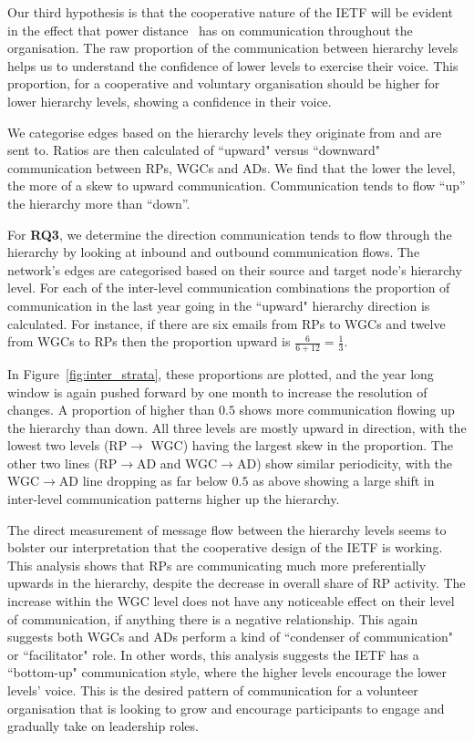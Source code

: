 \documentclass[twocolumn,10pt]{article}
\begin{document}
Our third hypothesis is that the cooperative nature of the IETF will be
evident in the effect that power distance~\cite{li2021does} has on
communication throughout the organisation. The raw proportion of the
communication between hierarchy levels helps us to understand the
confidence of lower levels to exercise their voice. This proportion, for a
cooperative and voluntary organisation should be higher for lower hierarchy
levels, showing a confidence in their voice.

We categorise edges based on the hierarchy levels they originate from and
are sent to. Ratios are then calculated of ``upward" versus ``downward"
communication between RPs, WGCs and ADs. We find that the lower the level,
the more of a skew to upward communication.  Communication tends to flow
``up'' the hierarchy more than ``down''. 


For \textbf{RQ3}, we determine the direction communication tends to flow
through the hierarchy by looking at inbound and outbound communication
flows. The network's edges are categorised based on their source and target
node's hierarchy level. For each of the inter-level communication
combinations the proportion of communication in the last year going in the
``upward" hierarchy direction is calculated. For instance, if there are six
emails from RPs to WGCs and twelve from WGCs to RPs then the proportion
upward is $\frac{6}{6+12}=\frac{1}{3}$. 

In Figure~\ref{fig:inter_strata}, these proportions are plotted, and the
year long window is again pushed forward by one month to increase the
resolution of changes. A proportion of higher than $0.5$ shows more
communication flowing up the hierarchy than down. All three levels are
mostly upward in direction, with the lowest two levels (RP$\rightarrow$
WGC) having the largest skew in the proportion. The other two lines
(RP$\rightarrow$AD and WGC$\rightarrow$AD) show similar periodicity, with
the WGC$\rightarrow$AD line dropping as far below $0.5$ as above showing a
large shift in inter-level communication patterns higher up the hierarchy.

The direct measurement of message flow between the hierarchy levels seems
to bolster our interpretation that the cooperative design of the IETF is
working. This analysis shows that RPs are communicating much more
preferentially upwards in the hierarchy, despite the decrease in overall
share of RP activity. The increase within the WGC level does not have any
noticeable effect on their level of communication, if anything there is a
negative relationship. This again suggests both WGCs and ADs perform a kind
of ``condenser of communication" or ``facilitator" role. In other words,
this analysis suggests the IETF has a ``bottom-up" communication style,
where the higher levels encourage the lower levels' voice.  This is the
desired pattern of communication for a volunteer organisation that is
looking to grow and encourage participants to engage and gradually take on
leadership roles.
\end{document}
